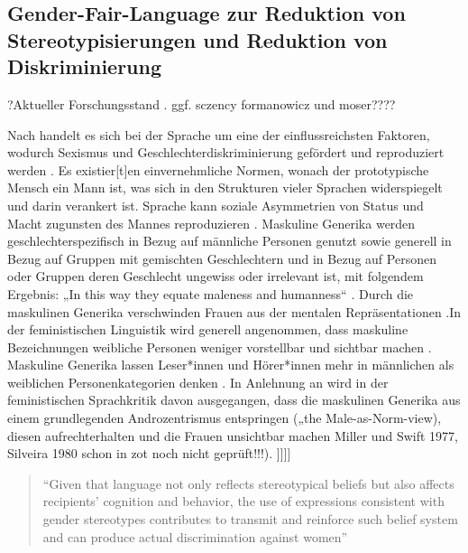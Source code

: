 \documentclass[12pt, 
    twoside=false, 
    bibliography=totoc, 
    numbers=endperiod, 
    headings=normal, 
    toc=chapterentrydotfill
    ]{scrbook}
\begin{document}
\subsection{Gender-Fair-Language zur Reduktion von Stereotypisierungen und Reduktion von Diskriminierung}

?Aktueller Forschungsstand . ggf. sczency formanowicz und moser???? 

Nach \textcite{menegatti_2017} handelt es sich bei der Sprache um eine der einflussreichsten Faktoren, wodurch Sexismus und Geschlechterdiskriminierung gefördert und reproduziert werden \parencite*[1]{menegatti_2017}. Es existier[t]en einvernehmliche Normen, wonach der prototypische Mensch ein Mann ist, was sich in den Strukturen vieler Sprachen widerspiegelt und darin verankert ist. Sprache kann soziale Asymmetrien von Status und Macht zugunsten des Mannes reproduzieren \parencite{menegatti_2017}.
Maskuline Generika werden geschlechterspezifisch in Bezug auf männliche Personen genutzt sowie generell in Bezug auf Gruppen mit gemischten Geschlechtern und in Bezug auf Personen oder Gruppen deren Geschlecht ungewiss oder irrelevant ist, mit folgendem Ergebnis: „In this way they equate maleness and humanness“ \parencite[169]{stahlberg_2007}. Durch die maskulinen Generika verschwinden Frauen aus der mentalen Repräsentationen \parencites{vaughan_2018}{stahlberg_2001}.In der feministischen Linguistik wird generell angenommen, dass maskuline Bezeichnungen weibliche Personen weniger vorstellbar und sichtbar machen \parencite[131]{stahlberg_2001}. Maskuline Generika lassen Leser*innen und Hörer*innen mehr in männlichen als weiblichen Personenkategorien denken \parencites[2]{sczesny_2016}{stahlberg_2007}. In Anlehnung an \textcite{stahlberg_2007} wird in der feministischen Sprachkritik davon ausgegangen, dass die maskulinen Generika aus einem grundlegenden Androzentrismus entspringen („the Male-as-Norm-view), diesen aufrechterhalten und die Frauen unsichtbar machen \parencites[170]{stahlberg_2007}{miller_1976}{silveira_1980} Miller und Swift 1977, Silveira 1980 schon in zot noch nicht geprüft!!!).
]]]]

\begin{quote}
    \enquote{Given that language not only reflects stereotypical beliefs but also affects recipients’ cognition and behavior, the use of expressions consistent with gender stereotypes contributes to transmit and reinforce such belief system and can produce actual discrimination against women} \parencite[2]{menegatti_2017}
\end{quote}
\end{document}
